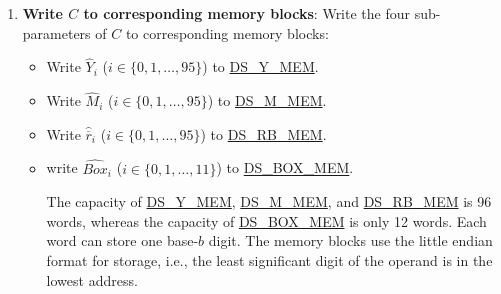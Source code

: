 \documentclass[main\_\_EN.tex]{subfiles}
\begin{document}
\begin{enumerate}
    \item {\bfseries Write \begin{math}C\end{math} to corresponding memory blocks}: Write the four sub-parameters of \begin{math}C\end{math} to corresponding memory blocks:
    \begin{itemize}
        \item Write \begin{math}\widehat{Y}_{i}\end{math}
        (\begin{math}i \in \{ 0, 1, \dots, 95 \} \end{math})
        to \hyperref[DSYMEM]{DS\_Y\_MEM}.

        \item Write \begin{math}\widehat{M}_{i}\end{math}
        (\begin{math}i \in \{ 0, 1, \dots, 95 \} \end{math})
        to \hyperref[DSMMEM]{DS\_M\_MEM}.

        \item Write \begin{math}\widehat{\overline{r}}_{i}\end{math}
        (\begin{math}i \in \{ 0, 1, \dots, 95 \} \end{math})
        to \hyperref[DSRBMEM]{DS\_RB\_MEM}.

        \item write \begin{math}\widehat{Box}_{i}\end{math}
        (\begin{math}i \in \{ 0, 1, \dots, 11 \} \end{math})
        to \hyperref[DSBOXMEM]{DS\_BOX\_MEM}.

        The capacity of
        \hyperref[DSYMEM]{DS\_Y\_MEM},
        \hyperref[DSMMEM]{DS\_M\_MEM}, and
        \hyperref[DSRBMEM]{DS\_RB\_MEM} is 96 words, whereas the capacity of
        \hyperref[DSBOXMEM]{DS\_BOX\_MEM} is only 12 words.
        Each word can store one base-\begin{math}b\end{math} digit. The memory blocks use the little endian format for storage, i.e., the least significant digit of the operand is in the lowest address.


\end{itemize}
\end{enumerate}
\end{document}
